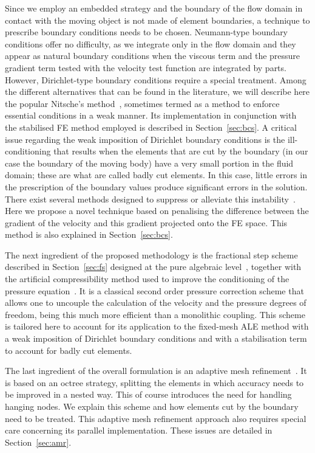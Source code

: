 \documentclass[11pt,a4paper,oneside,reqno]{amsart}
\begin{document}
Since we employ an embedded strategy and the boundary of the flow domain in contact with the moving object is not made of element boundaries, a technique to prescribe boundary conditions needs to be chosen. Neumann-type boundary conditions offer no difficulty, as we integrate only in the flow domain and they appear as natural boundary conditions when the viscous term and the pressure gradient term tested with the velocity test function are integrated by parts. However, Dirichlet-type boundary conditions require a special treatment. Among the different alternatives that can be found in the literature, we will describe here the popular Nitsche's method~\cite{juntunen-stenberg-09}, sometimes termed as a method to enforce essential conditions in a weak manner. Its implementation in conjunction with the stabilised FE method employed is described in Section~\ref{sec:bcs}. A critical issue regarding the weak imposition of Dirichlet boundary conditions is the ill-conditioning that results when the elements that are cut by the boundary (in our case the boundary of the moving body) have a very small portion in the fluid domain; these are what are called badly cut elements. In this case, little errors in the prescription of the boundary values produce significant errors in the solution. There exist several methods designed to suppress or alleviate this instability~\cite{burman-hansbo-2012-1,main-scovazzi-2018,badia-et-al-2021}. Here we propose a novel technique based on penalising the difference between the gradient of the velocity and this gradient projected onto the FE space. This method is also explained in Section~\ref{sec:bcs}.

The next ingredient of the proposed methodology is the fractional step scheme described in Section~\ref{sec:fs} designed at the pure algebraic level~\cite{BadiaCodina2007}, together with the artificial compressibility method used to improve the conditioning of the pressure equation~\cite{chorin3,guermond-minev-2015}. It is a classical second order pressure correction scheme that allows one to uncouple the calculation of the velocity and the pressure degrees of freedom, being this much more efficient than a monolithic coupling. This scheme is tailored here to account for its application to the fixed-mesh ALE method with a weak imposition of Dirichlet boundary conditions and with a stabilisation term to account for badly cut elements. 

The last ingredient of the overall formulation is an adaptive mesh refinement~\cite{baiges:siam_jsc17}. It is based on an octree strategy, splitting the elements in which accuracy needs to be improved in a nested way. This of course introduces the need for handling hanging nodes. We explain this scheme and how elements cut by the boundary need to be treated. This adaptive mesh refinement approach also requires special care concerning its parallel implementation. These issues are detailed in Section~\ref{sec:amr}.
\end{document}

